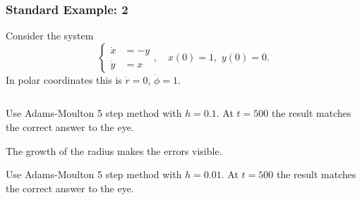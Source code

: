 \documentclass{beamer}
\begin{document}
\begin{frame}
  \frametitle{Standard Example: 2}


  Consider the system
  \begin{equation*}
    \left\{
      \begin{aligned}
        \dot{x} & = -y \\ \dot{y} & = x
      \end{aligned} \right., \quad x(0) = 1, \, \, y(0) = 0.
  \end{equation*}
  In polar coordinates this is $\dot{r} = 0$, $\dot{\phi} = 1$.
  \begin{columns}
    \begin{column}{0.5\textwidth}
      \begin{overlayarea}{\textwidth}{0.4\textheight}
        {
          Use Adams-Moulton 5 step method with
          $h=0.1$. At $t=500$ the result matches the correct answer to
          the eye.
        }
        {

          \vspace{1ex}
          The growth of the radius makes the errors visible.
        }
        {
          Use Adams-Moulton 5 step method with $h=0.01$. At $t=500$
          the result matches the correct answer to the eye.
        }
        {

}
\end{overlayarea}
\end{column}
\end{columns}
\end{frame}
\end{document}
